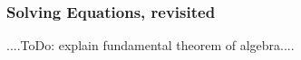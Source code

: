 







\subsubsection{Solving Equations, revisited}
....ToDo: explain fundamental theorem of algebra....

